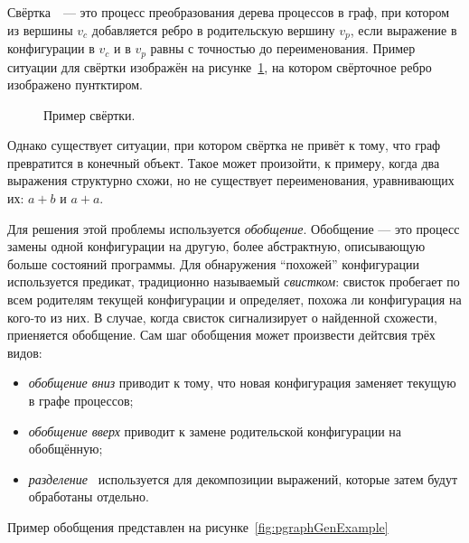 Свёртка~~--- это процесс преобразования дерева процессов в граф, при котором
из вершины $v_c$ добавляется ребро в родительскую вершину $v_p$,
если выражение в конфигурации в $v_c$ и в $v_p$ равны с точностью до переименования.
Пример ситуации для свёртки изображён на рисунке~\ref{fig:pgraphFoldingExample},
на котором свёрточное ребро изображено пунтктиром.

\begin{figure}[h!]
\center
{}

\caption{Пример свёртки.}
\label{fig:pgraphFoldingExample}
\end{figure}

Однако существует ситуации, при котором свёртка не привёт к тому, что граф превратится в
конечный объект. Такое может произойти, к примеру, когда два выражения структурно
схожи, но не существует переименования, уравнивающих их: $a + b$ и $a + a$.

Для решения этой проблемы используется \emph{обобщение}\cite{scGen}. Обобщение --- это процесс
замены одной конфигурации на другую, более абстрактную, описывающую больше состояний
программы. Для обнаружения ``похожей'' конфигурации используется предикат,
традиционно называемый \emph{свистком}: свисток пробегает по всем
родителям текущей конфигурации и определяет, похожа ли конфигурация на кого-то из них.
В случае, когда свисток сигнализирует о найденной схожести, приеняется обобщение.
Сам шаг обобщения может произвести дейтсвия трёх видов:
\begin{itemize}
\item \emph{обобщение вниз} приводит к тому, что новая конфигурация заменяет текущую в графе процессов;
\item \emph{обобщение вверх} приводит к замене родительской конфигурации на обобщённую;
\item \emph{разделение}~ используется для декомпозиции выражений, которые затем
будут обработаны отдельно.
\end{itemize}
Пример обобщения представлен на рисунке~\ref{fig:pgraphGenExample}


